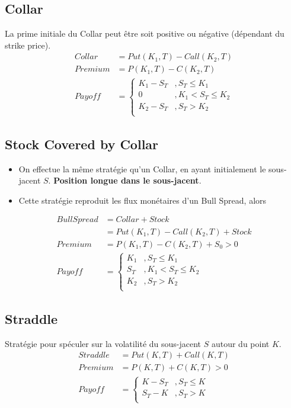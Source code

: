\documentclass[10pt, french]{article}
\begin{document}
\begin{multicols*}{2}
\subsection*{Collar}
La prime initiale du Collar peut être soit positive ou négative (dépendant du strike price).
\begin{align*}
Collar				& = Put(K_1, T) - Call(K_2, T) \\
Premium			& = P(K_1, T) - C(K_2,T) \\
Payoff				& = 
\begin{cases}
K_1 - S_T			& , S_T \leq K_1 \\
0						& , K_1 < S_T \leq K_2 \\
K_2 - S_T			& , S_T > K_2 \\
\end{cases}
\end{align*}



\subsection*{Stock Covered by Collar}
\begin{itemize}
\item On effectue la même stratégie qu'un Collar, en ayant initialement le sous-jacent $S$. \textbf{Position longue dans le sous-jacent}.
\item Cette stratégie reproduit les flux monétaires d'un Bull Spread, alors
\end{itemize}
\begin{align*}
BullSpread				& = Collar + Stock \\
								& = Put(K_1, T) - Call(K_2, T) + Stock \\
Premium					& = P(K_1, T) - C(K_2,T) + S_0 > 0  \\
Payoff						& = 
\begin{cases}
K_1 					& , S_T \leq K_1 \\
S_T					& , K_1 < S_T \leq K_2 \\
K_2 					& , S_T > K_2 \\
\end{cases}
\end{align*}



\subsection*{Straddle}
Stratégie pour spéculer sur la volatilité du sous-jacent $S$ autour du point $K$.
\begin{align*}
Straddle			& = Put(K,T) + Call(K,T) \\
Premium			& = P(K,T) + C(K,T) > 0 \\
Payoff				& =
\begin{cases}
K - S_T				& , S_T \leq K \\
S_T - K				& , S_T > K \\
\end{cases}
\end{align*}



\end{multicols*}
\end{document}
